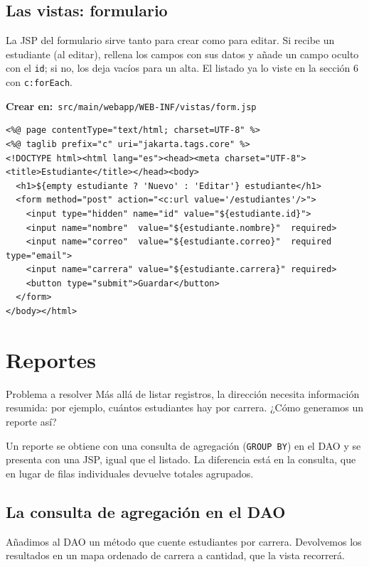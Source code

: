 \documentclass[11pt]{article}
\begin{document}
\subsection{Las vistas: formulario}
La JSP del formulario sirve tanto para crear como para editar. Si recibe un estudiante (al editar), rellena los campos con sus datos y añade un campo oculto con el \texttt{id}; si no, los deja vacíos para un alta. El listado ya lo viste en la sección 6 con \texttt{c:\allowbreak{}for\allowbreak{}Each}.

{\small\color{jwebazulo}\textbf{Crear en:}~}\texttt{src/\allowbreak{}main/\allowbreak{}webapp/\allowbreak{}WEB-INF/\allowbreak{}vistas/\allowbreak{}form.\allowbreak{}jsp}\par\nobreak\vspace{-1pt}
\begin{cajacodigo}
\begin{lstlisting}[style=markup]
<%@ page contentType="text/html; charset=UTF-8" %>
<%@ taglib prefix="c" uri="jakarta.tags.core" %>
<!DOCTYPE html><html lang="es"><head><meta charset="UTF-8">
<title>Estudiante</title></head><body>
  <h1>${empty estudiante ? 'Nuevo' : 'Editar'} estudiante</h1>
  <form method="post" action="<c:url value='/estudiantes'/>">
    <input type="hidden" name="id" value="${estudiante.id}">
    <input name="nombre"  value="${estudiante.nombre}"  required>
    <input name="correo"  value="${estudiante.correo}"  required type="email">
    <input name="carrera" value="${estudiante.carrera}" required>
    <button type="submit">Guardar</button>
  </form>
</body></html>
\end{lstlisting}
\end{cajacodigo}
\vspace{2pt}
\section{Reportes}
\begin{cajaproblema}{Problema a resolver}
Más allá de listar registros, la dirección necesita información resumida: por ejemplo, cuántos estudiantes hay por carrera. ¿Cómo generamos un reporte así?\par
\end{cajaproblema}
Un reporte se obtiene con una consulta de agregación (\texttt{GROUP BY}) en el DAO y se presenta con una JSP, igual que el listado. La diferencia está en la consulta, que en lugar de filas individuales devuelve totales agrupados.

\subsection{La consulta de agregación en el DAO}
Añadimos al DAO un método que cuente estudiantes por carrera. Devolvemos los resultados en un mapa ordenado de carrera a cantidad, que la vista recorrerá.
\end{document}
